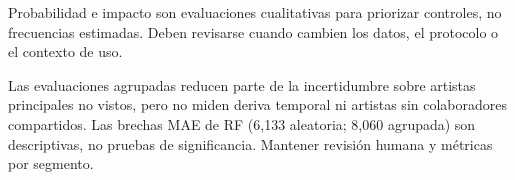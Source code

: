 Probabilidad e impacto son evaluaciones cualitativas para priorizar controles, no frecuencias
estimadas. Deben revisarse cuando cambien los datos, el protocolo o el contexto de uso.

Las evaluaciones agrupadas reducen parte de la incertidumbre sobre artistas principales no vistos,
pero no miden deriva temporal ni artistas sin colaboradores compartidos. Las brechas MAE de RF
(6,133 aleatoria; 8,060 agrupada) son descriptivas, no pruebas de significancia. Mantener revisión
humana y métricas por segmento.
